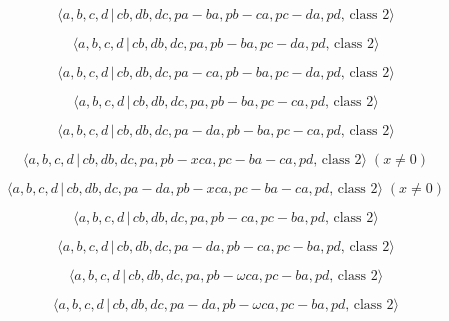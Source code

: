 \documentclass[10pt]{article}
\begin{document}
\begin{equation}
\langle a,b,c,d\,|\,cb,db,dc,pa-ba,pb-ca,pc-da,pd,\,\text{class }2\rangle 
\tag{7.3200}
\end{equation}

\begin{equation}
\langle a,b,c,d\,|\,cb,db,dc,pa,pb-ba,pc-da,pd,\,\text{class }2\rangle 
\tag{7.3201}
\end{equation}

\begin{equation}
\langle a,b,c,d\,|\,cb,db,dc,pa-ca,pb-ba,pc-da,pd,\,\text{class }2\rangle 
\tag{7.3202}
\end{equation}

\begin{equation}
\langle a,b,c,d\,|\,cb,db,dc,pa,pb-ba,pc-ca,pd,\,\text{class }2\rangle 
\tag{7.3203}
\end{equation}

\begin{equation}
\langle a,b,c,d\,|\,cb,db,dc,pa-da,pb-ba,pc-ca,pd,\,\text{class }2\rangle 
\tag{7.3204}
\end{equation}

\begin{equation}
\langle a,b,c,d\,|\,cb,db,dc,pa,pb-xca,pc-ba-ca,pd,\,\text{class }2\rangle
\;(x \neq 0)  \tag{7.3205}
\end{equation}

\begin{equation}
\langle a,b,c,d\,|\,cb,db,dc,pa-da,pb-xca,pc-ba-ca,pd,\,\text{class }%
2\rangle \;(x \neq 0)  \tag{7.3206}
\end{equation}

\begin{equation}
\langle a,b,c,d\,|\,cb,db,dc,pa,pb-ca,pc-ba,pd,\,\text{class }2\rangle 
\tag{7.3207}
\end{equation}

\begin{equation}
\langle a,b,c,d\,|\,cb,db,dc,pa-da,pb-ca,pc-ba,pd,\,\text{class }2\rangle 
\tag{7.3208}
\end{equation}

\begin{equation}
\langle a,b,c,d\,|\,cb,db,dc,pa,pb-\omega ca,pc-ba,pd,\,\text{class }2\rangle
\tag{7.3209}
\end{equation}

\begin{equation}
\langle a,b,c,d\,|\,cb,db,dc,pa-da,pb-\omega ca,pc-ba,pd,\,\text{class }%
2\rangle  \tag{7.3210}
\end{equation}
\end{document}
